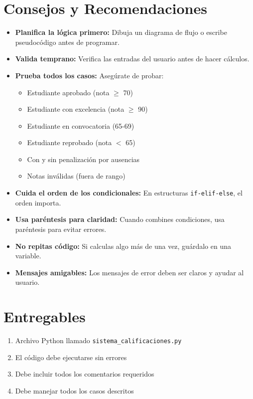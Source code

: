 \documentclass[12pt,a4paper]{article}
\begin{document}
\section{Consejos y Recomendaciones}

\begin{itemize}[leftmargin=*]
    \item \textbf{Planifica la lógica primero:} Dibuja un diagrama de flujo o escribe pseudocódigo antes de programar.
    
    \item \textbf{Valida temprano:} Verifica las entradas del usuario antes de hacer cálculos.
    
    \item \textbf{Prueba todos los casos:} Asegúrate de probar:
    \begin{itemize}
        \item Estudiante aprobado (nota $\geq$ 70)
        \item Estudiante con excelencia (nota $\geq$ 90)
        \item Estudiante en convocatoria (65-69)
        \item Estudiante reprobado (nota $<$ 65)
        \item Con y sin penalización por ausencias
        \item Notas inválidas (fuera de rango)
    \end{itemize}
    
    \item \textbf{Cuida el orden de los condicionales:} En estructuras \texttt{if-elif-else}, el orden importa.
    
    \item \textbf{Usa paréntesis para claridad:} Cuando combines condiciones, usa paréntesis para evitar errores.
    
    \item \textbf{No repitas código:} Si calculas algo más de una vez, guárdalo en una variable.
    
    \item \textbf{Mensajes amigables:} Los mensajes de error deben ser claros y ayudar al usuario.
\end{itemize}

\section{Entregables}

\begin{enumerate}[leftmargin=*]
    \item Archivo Python llamado \texttt{sistema\_calificaciones.py}
    \item El código debe ejecutarse sin errores
    \item Debe incluir todos los comentarios requeridos
    \item Debe manejar todos los casos descritos
\end{enumerate}
\end{document}

